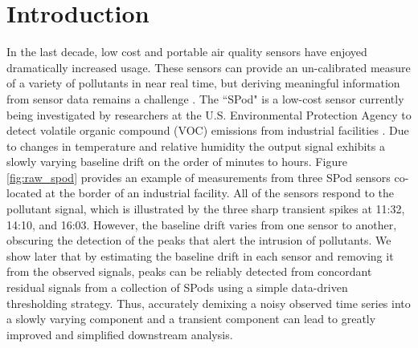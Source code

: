 \documentclass[aoas]{imsart}
\begin{document}
\begin{frontmatter}

\begin{keyword}
\end{keyword}

\end{frontmatter}


\section{Introduction}
\label{sec:intro}
In the last decade, low cost and portable air quality sensors have enjoyed dramatically increased usage. These sensors can provide an un-calibrated measure of a variety of pollutants in near real time, but deriving meaningful information from sensor data remains a challenge \citep{snyder2013changing}. The ``SPod" is a low-cost sensor currently being investigated by researchers at the U.S. Environmental Protection Agency to detect volatile organic compound (VOC) emissions from industrial facilities \citep{thoma2016south}. Due to changes in temperature and relative humidity the output signal exhibits a slowly varying baseline drift on the order of minutes to hours. Figure \ref{fig:raw_spod} provides an example of measurements from three SPod sensors co-located at the border of an industrial facility. All of the sensors respond to the pollutant signal, which is illustrated by the three sharp transient spikes at 11:32, 14:10, and 16:03. However, the baseline drift varies from one sensor to another, obscuring the detection of the peaks that alert the intrusion of pollutants. We show later that by estimating the baseline drift in each sensor and  removing it from the observed signals, peaks can be reliably detected from concordant residual signals from a collection of SPods using a simple data-driven thresholding strategy. Thus, accurately demixing a noisy observed time series into a slowly varying component and a transient component can lead to greatly improved and simplified downstream analysis. 
\end{document}
